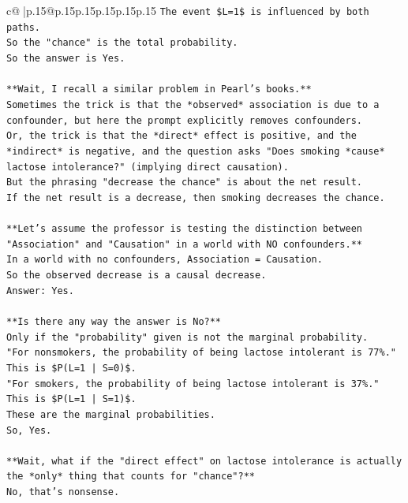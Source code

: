 \documentclass{article}
\begin{document}
{\begin{supertabular}{c@{$\;$}|p{.15\linewidth}@{}p{.15\linewidth}p{.15\linewidth}p{.15\linewidth}p{.15\linewidth}p{.15\linewidth}}
{{{\texttt{The event \$L=1\$ is influenced by both paths.} \\
\texttt{So the "chance" is the total probability.} \\
\texttt{So the answer is Yes.} \\
\\ 
\texttt{**Wait, I recall a similar problem in Pearl's books.**} \\
\texttt{Sometimes the trick is that the *observed* association is due to a confounder, but here the prompt explicitly removes confounders.} \\
\texttt{Or, the trick is that the *direct* effect is positive, and the *indirect* is negative, and the question asks "Does smoking *cause* lactose intolerance?" (implying direct causation).} \\
\texttt{But the phrasing "decrease the chance" is about the net result.} \\
\texttt{If the net result is a decrease, then smoking decreases the chance.} \\
\\ 
\texttt{**Let's assume the professor is testing the distinction between "Association" and "Causation" in a world with NO confounders.**} \\
\texttt{In a world with no confounders, Association = Causation.} \\
\texttt{So the observed decrease is a causal decrease.} \\
\texttt{Answer: Yes.} \\
\\ 
\texttt{**Is there any way the answer is No?**} \\
\texttt{Only if the "probability" given is not the marginal probability.} \\
\texttt{"For nonsmokers, the probability of being lactose intolerant is 77\%."} \\
\texttt{This is \$P(L=1 | S=0)\$.} \\
\texttt{"For smokers, the probability of being lactose intolerant is 37\%."} \\
\texttt{This is \$P(L=1 | S=1)\$.} \\
\texttt{These are the marginal probabilities.} \\
\texttt{So, Yes.} \\
\\ 
\texttt{**Wait, what if the "direct effect" on lactose intolerance is actually the *only* thing that counts for "chance"?**} \\
\texttt{No, that's nonsense.} \\
}}}
\end{supertabular}}
\end{document}
